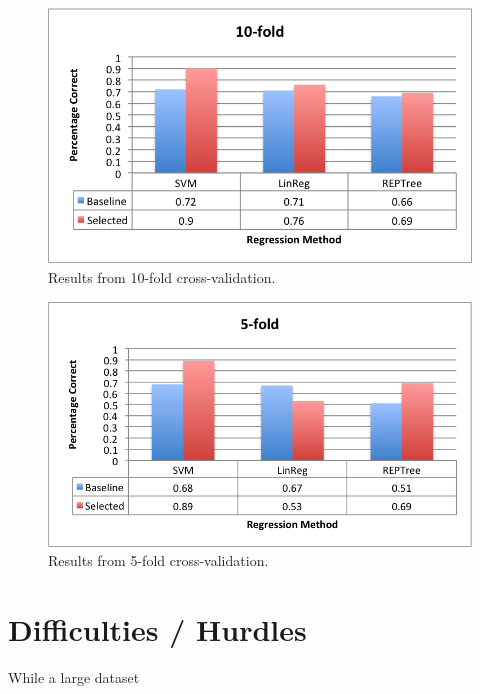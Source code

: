 \documentclass[11pt]{article} %
\begin{document}
\begin{figure}
\includegraphics{../results/10fold.png}
\caption{Results from 10-fold cross-validation.}
\end{figure}
\begin{figure}
\includegraphics{../results/5fold.png}
\caption{Results from 5-fold cross-validation.}
\end{figure}

\section{Difficulties / Hurdles}

While a large dataset 



\end{document}
